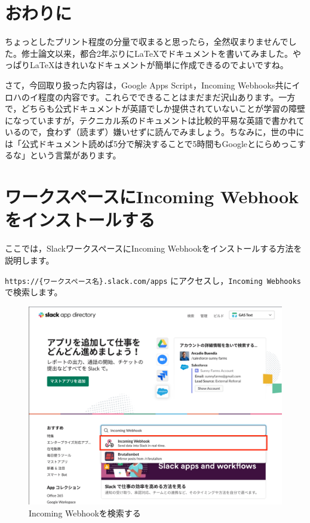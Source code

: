\documentclass[uplatex,a4j]{jsarticle}
\begin{document}
\section{おわりに}


ちょっとしたプリント程度の分量で収まると思ったら，全然収まりませんでした。修士論文以来，都合2年ぶりに\LaTeX でドキュメントを書いてみました。やっぱり\LaTeX はきれいなドキュメントが簡単に作成できるのでよいですね。


さて，今回取り扱った内容は，Google Apps Script，Incoming Webhooks共にイロハのイ程度の内容です。これらでできることはまだまだ沢山あります。一方で，どちらも公式ドキュメントが英語でしか提供されていないことが学習の障壁になっていますが，テクニカル系のドキュメントは比較的平易な英語で書かれているので，食わず（読まず）嫌いせずに読んでみましょう。ちなみに，世の中には「公式ドキュメント読めば5分で解決することで5時間もGoogleとにらめっこするな」という言葉があります\footnotemark。

\clearpage
\appendix

\section{ワークスペースにIncoming Webhookをインストールする}
\label{appendix:install incoming webhooks}

ここでは，SlackワークスペースにIncoming Webhookをインストールする方法を説明します。

\verb|https://{ワークスペース名}.slack.com/apps| にアクセスし，\verb|Incoming Webhooks|で検索します。

\begin{figure}[H]
 \centering
 \includegraphics[keepaspectratio, scale=0.7]{images/search_incoming_webhook.png}
 \caption{Incoming Webhookを検索する}
 \label{fig:search_incoming_webhook}
\end{figure}
\end{document}

